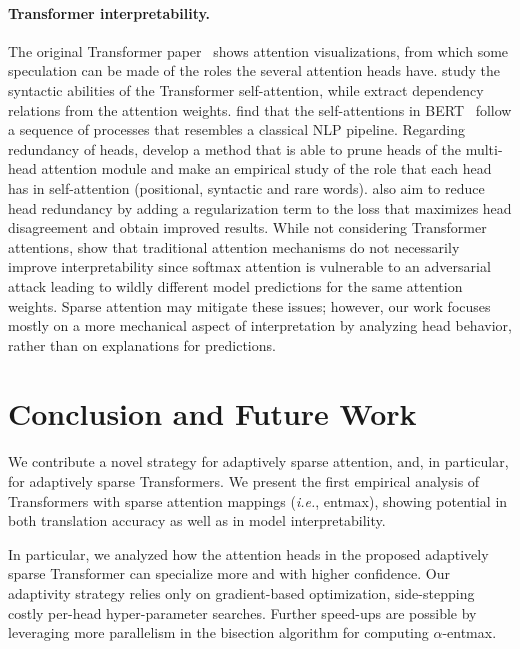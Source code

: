 \documentclass[11pt,a4paper]{article}
\makeatletter
\newcommand*{\ie}{\textit{i.\hspace{.07em}e.}\@\xspace}
\newcommand*\entmaxtext{entmax\xspace}
\makeatother
\begin{document}
\paragraph{Transformer interpretability.}
The original Transformer paper~\citep{vaswani2017attention} shows
attention visualizations, from which some speculation can be made of
the roles the several attention heads have.
\citet{marecek-rosa-2018-extracting} study the syntactic abilities of
the Transformer self-attention, while \citet{raganato2018analysis}
extract dependency relations from the attention weights.
\citet{bert-rediscovers} find that the self-attentions in
BERT~\citep{devlin2018bert} follow a sequence of processes that
resembles a classical NLP pipeline. Regarding redundancy of heads,
\citet{specialized} develop a method that is able to prune heads of
the multi-head attention module and make an empirical study of the
role that each head has in self-attention (positional, syntactic and
rare words). \citet{li2018multi} also aim to reduce head redundancy
by adding a regularization term to the loss that maximizes head
disagreement and obtain improved results. While not considering
Transformer attentions, \citet{jain2019attention} show that
traditional attention mechanisms do not necessarily improve
interpretability since softmax attention is vulnerable to an
adversarial attack leading to wildly different model predictions for
the same attention weights. Sparse attention may mitigate these
issues; however, our work focuses mostly on a more mechanical aspect
of interpretation by analyzing head behavior, rather than on
explanations for predictions.

\section{Conclusion and Future Work}
We contribute a novel strategy for adaptively sparse attention, and,
in particular, for adaptively sparse Transformers. We present the
first empirical analysis of Transformers with sparse attention
mappings (\ie, \entmaxtext), showing potential in both translation
accuracy as well as in model interpretability.

In particular, we analyzed how the attention heads in the proposed
adaptively sparse Transformer can specialize more and with higher
confidence. Our adaptivity strategy relies only on gradient-based
optimization, side-stepping costly per-head hyper-parameter searches.
Further speed-ups are possible by leveraging more parallelism in the
bisection algorithm for computing $\alpha$-\entmaxtext.
\end{document}
